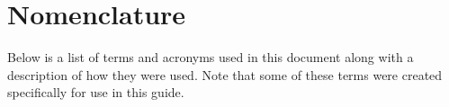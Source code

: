 \documentclass{mcscert}
\begin{document}


\section{Nomenclature}
\label{sec:nomenclature}
Below is a list of terms and acronyms used in this document along with a description of how they were used.	
Note that some of these terms were created specifically for use in this guide.
	
\end{document}
